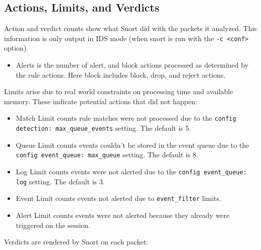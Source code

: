 \documentclass[english]{report}
\begin{document}
\subsection{Actions, Limits, and Verdicts}

Action and verdict counts show what Snort did with the packets it analyzed.
This information is only output in IDS mode (when snort is run with the
\texttt{-c <conf>} option).

\begin{itemize}
\item Alerts is the number of alert, and block actions processed as
determined by the rule actions.  Here block includes block, drop, and reject
actions.
\end{itemize}

Limits arise due to real world constraints on processing time and available
memory.  These indicate potential actions that did not happen:

\begin{itemize}
\item Match Limit counts rule matches were not processed due to the
\texttt{config detection: max\_queue\_events} setting.  The default is 5.

\item Queue Limit counts events couldn't be stored in the event queue
due to the \texttt{config event\_queue: max\_queue} setting.  The default is 8.

\item Log Limit counts events were not alerted due to the
\texttt{config event\_queue: log} setting.  The default is 3.

\item Event Limit counts events not alerted due to 
\texttt{event\_filter} limits.

\item Alert Limit counts events were not alerted because they already
were triggered on the session.
\end{itemize}

Verdicts are rendered by Snort on each packet:
\end{document}
